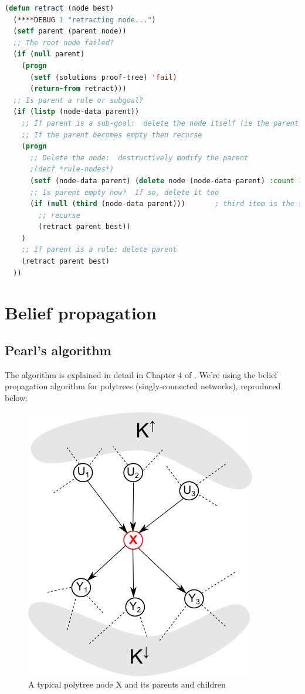 \begin{lstlisting}[language=Lisp]
(defun retract (node best)
  (****DEBUG 1 "retracting node...")
  (setf parent (parent node))
  ;; The root node failed?
  (if (null parent)
    (progn
      (setf (solutions proof-tree) 'fail)
      (return-from retract)))
  ;; Is parent a rule or subgoal?
  (if (listp (node-data parent))
    ;; If parent is a sub-goal:  delete the node itself (ie the parent's child);
    ;; If the parent becomes empty then recurse
    (progn
      ;; Delete the node:  destructively modify the parent
      ;(decf *rule-nodes*)
      (setf (node-data parent) (delete node (node-data parent) :count 1))
      ;; Is parent empty now?  If so, delete it too
      (if (null (third (node-data parent)))       ; third item is the subgoal's first argument
        ;; recurse
        (retract parent best))
    )
    ;; If parent is a rule: delete parent
    (retract parent best)
  ))
\end{lstlisting}

\section{Belief propagation}

\subsection{Pearl's algorithm}

The algorithm is explained in detail in Chapter 4 of \citep*{Pearl1988}.  We're using the belief
propagation algorithm for polytrees (singly-connected networks), reproduced below:
\begin{figure}[h]
\centering
\includegraphics{polytree-typical-node.png}
\caption{A typical polytree node X and its parents and children}
\end{figure}

